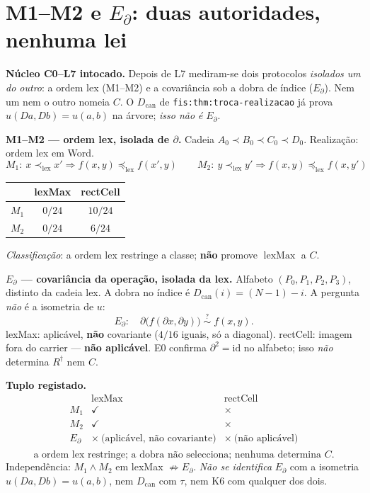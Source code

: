 \documentclass[11pt,a4paper]{article}
\newcommand{\code}[1]{\texttt{\small #1}}
\begin{document}
\section{M1--M2 e $E_{\partial}$: duas autoridades, nenhuma lei}\label{comb:me}

\noindent\textbf{Núcleo C0--L7 intocado.} Depois de L7 mediram-se
dois protocolos \emph{isolados um do outro}: a ordem lex (M1--M2) e a
covariância sob a dobra de índice ($E_{\partial}$). Nem um nem o outro nomeia
$C$. O $D_{\mathrm{can}}$ de \code{fis:thm:troca-realizacao} já prova
$u(Da,Db)=u(a,b)$ na árvore; \emph{isso não é} $E_{\partial}$.

\medskip\noindent\textbf{M1--M2 --- ordem lex, isolada de $\partial$.}
Cadeia $A_0\prec B_0\prec C_0\prec D_0$. Realização: ordem lex em Word.
\[
M_1:\ x\prec_{\mathrm{lex}}x'\Rightarrow f(x,y)\preceq_{\mathrm{lex}}f(x',y)
\qquad
M_2:\ y\prec_{\mathrm{lex}}y'\Rightarrow f(x,y)\preceq_{\mathrm{lex}}f(x,y')
\]
\begin{center}\footnotesize
\begin{tabular}{@{}lcc@{}}
\toprule
 & lexMax & rectCell \\
\midrule
$M_1$ & $0/24$ & $10/24$ \\
$M_2$ & $0/24$ & $6/24$ \\
\bottomrule
\end{tabular}
\end{center}
\emph{Classificação}: a ordem lex restringe a classe; \textbf{não} promove
$\operatorname{lexMax}$ a $C$.

\medskip\noindent\textbf{$E_{\partial}$ --- covariância da operação, isolada da lex.}
Alfabeto $(P_0,P_1,P_2,P_3)$, distinto da cadeia lex. A dobra no índice é
$D_{\mathrm{can}}(i)=(N-1)-i$. A pergunta \emph{não} é a isometria de $u$:
\[
E_{\partial}:\quad
\partial\bigl(f(\partial x,\partial y)\bigr)\;\stackrel{?}{\sim}\;f(x,y).
\]
lexMax: aplicável, \textbf{não} covariante ($4/16$ iguais, só a diagonal).
rectCell: imagem fora do carrier --- \textbf{não aplicável}.
E0 confirma $\partial^{2}=\mathrm{id}$ no alfabeto; isso \emph{não} determina
$R^{\dagger}$ nem $C$.

\medskip\noindent\textbf{Tuplo registado.}
\[
\boxed{
\begin{array}{c|cc}
 & \operatorname{lexMax} & \operatorname{rectCell} \\
\hline
M_1 & \checkmark & \times \\
M_2 & \checkmark & \times \\
E_{\partial} & \times\ \text{(aplicável, não covariante)} & \times\ \text{(não aplicável)} \\
\end{array}}
\]
\[
\boxed{\text{a ordem lex restringe; a dobra não selecciona; nenhuma determina }C.}
\]
Independência: $M_1\wedge M_2$ em lexMax $\not\Rightarrow E_{\partial}$.
\emph{Não se identifica} $E_{\partial}$ com a isometria $u(Da,Db)=u(a,b)$, nem
$D_{\mathrm{can}}$ com $\tau$, nem K6 com qualquer dos dois.
\end{document}
